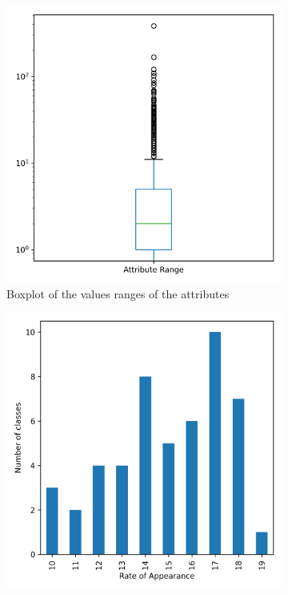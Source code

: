 \documentclass[a4paper,11pt]{article}
\begin{document}
    \begin{figure}[h!]
        \centering
        \begin{subfigure}[c]{0.45\textwidth}
            \centering
            \includegraphics[width=1\textwidth]{exercise_1/paper/figures/amazon_classes_range_plot.png}
            \caption{Boxplot of the values ranges of the attributes}
            \label{fig:amazon_value_ranges}
        \end{subfigure}
        \begin{subfigure}[c]{0.45\textwidth}
            \centering
            \includegraphics[width=1\textwidth]{figures/amazon_classes_bar.png}

\end{subfigure}
\end{figure}
\end{document}
